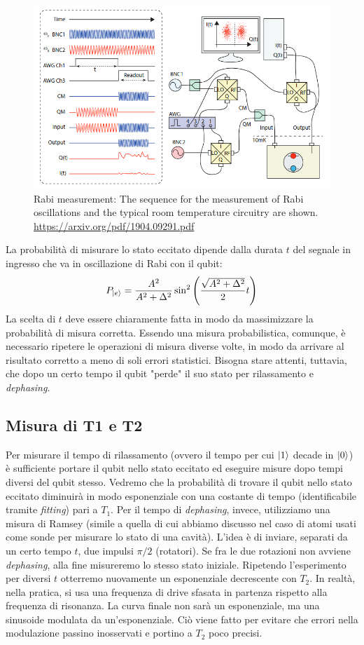 \begin{figure}[H]
    \centering
    \includegraphics[width=\textwidth]{images/rabi_measur_heterodyne.png}
    \caption{Rabi measurement: The sequence for the measurement of Rabi oscillations and the typical
room temperature circuitry are shown. \url{https://arxiv.org/pdf/1904.09291.pdf}}
\end{figure}
La probabilità di misurare lo stato eccitato dipende dalla durata $t$ del segnale in ingresso che va in oscillazione di Rabi con il qubit:
\begin{equation*}
    P_{\ket e}= \frac{A^2}{A^2 + \Delta^2} \sin^2 \left( \frac{\sqrt{A^2 + \Delta ^ 2}}{2}t \right)
\end{equation*}
La scelta di $t$ deve essere chiaramente fatta in modo da massimizzare la probabilità di misura corretta.
Essendo una misura probabilistica, comunque, è necessario ripetere le operazioni di misura diverse volte, in modo da arrivare al risultato corretto a meno di soli errori statistici. 
Bisogna stare attenti, tuttavia, che dopo un certo tempo il qubit "perde" il suo stato per rilassamento e \textit{dephasing}.

\subsection{Misura di T1 e T2}
Per misurare il tempo di rilassamento (ovvero il tempo per cui $\ket 1$ decade in $\ket 0$) è sufficiente portare il qubit nello stato eccitato ed eseguire misure dopo tempi diversi del qubit stesso. Vedremo che la probabilità di trovare il qubit nello stato eccitato diminuirà in modo esponenziale con una costante di tempo (identificabile tramite \textit{fitting}) pari a $T_1$.
Per il tempo di \textit{dephasing}, invece, utilizziamo una misura di Ramsey (simile a quella di cui abbiamo discusso nel caso di atomi usati come sonde per misurare lo stato di una cavità).
L'idea è di inviare, separati da un certo tempo $t$, due impulsi $\pi/2$ (rotatori). Se fra le due rotazioni non avviene \textit{dephasing}, alla fine misureremo lo stesso stato iniziale. Ripetendo l'esperimento per diversi $t$ otterremo nuovamente un esponenziale decrescente con $T_2$. 
In realtà, nella pratica, si usa una frequenza di drive sfasata in partenza rispetto alla frequenza di risonanza. La curva finale non sarà un esponenziale, ma una sinusoide modulata da un'esponenziale. Ciò viene fatto per evitare che errori nella modulazione passino inosservati e portino a $T_2$ poco precisi.

